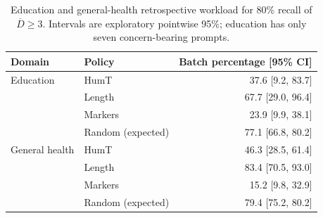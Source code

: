 \begin{table}[t]
\centering\small
\caption{Education and general-health retrospective workload for 80\% recall of $\overline D\geq3$. Intervals are exploratory pointwise 95\%; education has only seven concern-bearing prompts.}
\label{tab:workload_transfer}
\begin{tabular}{llr}
\toprule
Domain & Policy & Batch percentage [95\% CI] \\
\midrule
Education & HumT & 37.6 [9.2, 83.7] \\
 & Length & 67.7 [29.0, 96.4] \\
 & Markers & 23.9 [9.9, 38.1] \\
 & Random (expected) & 77.1 [66.8, 80.2] \\
General health & HumT & 46.3 [28.5, 61.4] \\
 & Length & 83.4 [70.5, 93.0] \\
 & Markers & 15.2 [9.8, 32.9] \\
 & Random (expected) & 79.4 [75.2, 80.2] \\
\bottomrule
\end{tabular}
\end{table}
